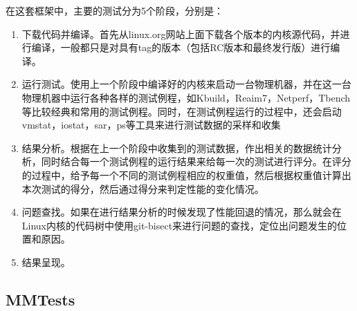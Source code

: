 在这套框架中，主要的测试分为5个阶段，分别是：
\begin{enumerate}
\item 下载代码并编译。首先从linux.org网站上面下载各个版本的内核源代码，并进行编译，一般都只是对具有tag的版本（包括RC版本和最终发行版）进行编译。
\item 运行测试。使用上一个阶段中编译好的内核来启动一台物理机器，并在这一台物理机器中运行各种各样的测试例程，如Kbuild，Reaim7，Netperf，Tbench等比较经典和常用的测试例程。同时，在测试例程运行的过程中，还会启动vmstat，iostat，sar，ps等工具来进行测试数据的采样和收集
\item 结果分析。根据在上一个阶段中收集到的测试数据，作出相关的数据统计分析，同时结合每一个测试例程的运行结果来给每一次的测试进行评分。在评分的过程中，给予每一个不同的测试例程相应的权重值，然后根据权重值计算出本次测试的得分，然后通过得分来判定性能的变化情况。
\item 问题查找。如果在进行结果分析的时候发现了性能回退的情况，那么就会在Linux内核的代码树中使用git-bisect来进行问题的查找，定位出问题发生的位置和原因。
\item 结果呈现。
\end{enumerate}

\subsection{MMTests}